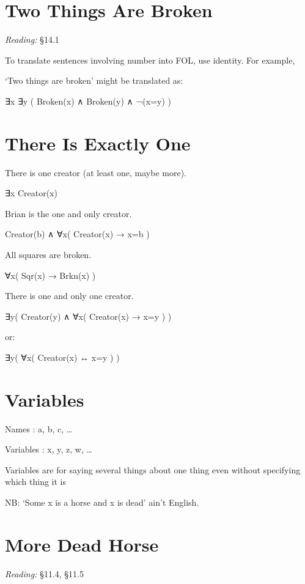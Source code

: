 \documentclass[12pt]{extarticle}
\begin{document}
\begin{multicols*}{3}
 
\section{Two Things Are Broken}
 
\emph{Reading:} §14.1
 
To translate sentences involving number into FOL, use identity. For example,
 
`Two things are broken' might be translated as:
 
∃x ∃y ( Broken(x) ∧ Broken(y) ∧ ¬(x=y) )
 
 
 
\section{There Is Exactly One}
 
There is one creator (at least one, maybe more).
 
∃x Creator(x)
 
Brian is the one and only creator.
 
Creator(b) ∧ ∀x( Creator(x) → x=b )
 
All squares are broken.
 
∀x( Sqr(x) → Brkn(x) )
 
There is one and only one creator.
 
∃y( Creator(y) ∧ ∀x( Creator(x) → x=y ) )
 
or:
 
∃y( ∀x( Creator(x) ↔ x=y ) )
 
 
 
\section{Variables}
 
Names : a, b, c, …
 
Variables : x, y, z, w, …
 
Variables are for saying several things about one thing even without specifying which thing it is
 
NB: `Some x is a horse and x is dead' ain't English.
 
 
 
\section{More Dead Horse}
 
\emph{Reading:} §11.4, §11.5
 

\end{multicols*}
\end{document}
